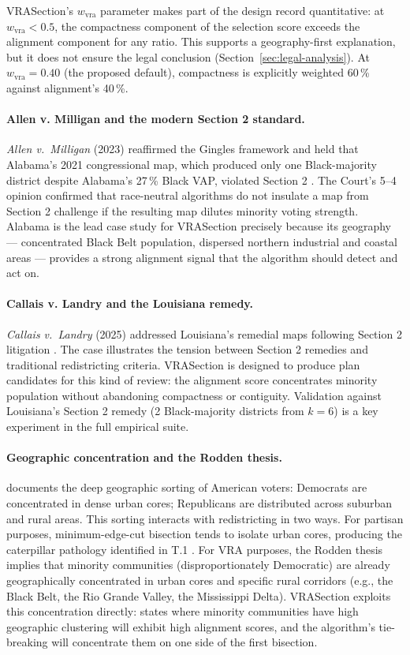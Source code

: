 VRASection's $w_\text{vra}$ parameter makes part of the design record
quantitative:
at $w_\text{vra} < 0.5$, the compactness component of the selection score
exceeds the alignment component for any ratio.  This supports a
geography-first explanation, but it does not ensure the legal conclusion
(Section~\ref{sec:legal-analysis}).
At $w_\text{vra} = 0.40$ (the proposed default), compactness is explicitly
weighted 60\,\% against alignment's 40\,\%.

\paragraph{Allen v. Milligan and the modern Section 2 standard.}
\emph{Allen v.\ Milligan} (2023) reaffirmed the Gingles framework and
held that Alabama's 2021 congressional map, which produced only one
Black-majority district despite Alabama's 27\,\% Black VAP, violated
Section 2 \citep{allen2023}.
The Court's 5--4 opinion confirmed that race-neutral algorithms do not
insulate a map from Section 2 challenge if the resulting map dilutes
minority voting strength.
Alabama is the lead case study for VRASection precisely because its
geography --- concentrated Black Belt population, dispersed northern
industrial and coastal areas --- provides a strong alignment signal that
the algorithm should detect and act on.

\paragraph{Callais v. Landry and the Louisiana remedy.}
\emph{Callais v.\ Landry} (2025) addressed Louisiana's remedial maps
following Section 2 litigation \citep{callais2025}.
The case illustrates the tension between Section 2 remedies and traditional
redistricting criteria.
VRASection is designed to produce plan candidates for this kind of review:
the alignment score concentrates minority population without abandoning
compactness or contiguity.
Validation against Louisiana's Section 2 remedy (2 Black-majority districts
from $k=6$) is a key experiment in the full empirical suite.

\paragraph{Geographic concentration and the Rodden thesis.}
\citet{rodden2019} documents the deep geographic sorting of American voters:
Democrats are concentrated in dense urban cores; Republicans are distributed
across suburban and rural areas.
This sorting interacts with redistricting in two ways.
For partisan purposes, minimum-edge-cut bisection tends to isolate urban
cores, producing the caterpillar pathology identified in T.1 \citep{b8paper}.
For VRA purposes, the Rodden thesis implies that minority communities
(disproportionately Democratic) are already geographically concentrated
in urban cores and specific rural corridors (e.g., the Black Belt, the
Rio Grande Valley, the Mississippi Delta).
VRASection exploits this concentration directly: states where minority
communities have high geographic clustering will exhibit high alignment
scores, and the algorithm's tie-breaking will concentrate them on one
side of the first bisection.

